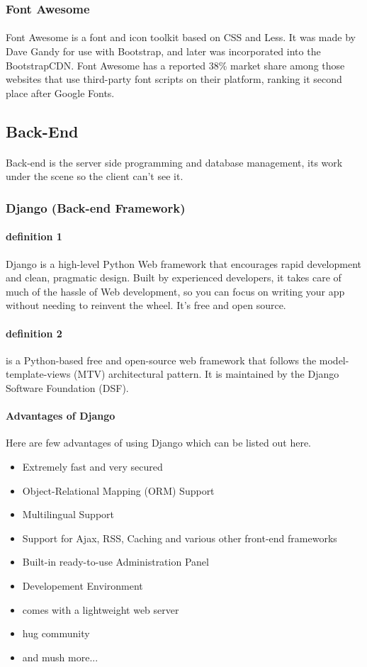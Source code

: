 \documentclass{article}
\begin{document}
	\subsubsection{Font Awesome}
	\paragraph{}
	Font Awesome is a font and icon toolkit based on CSS and Less. It was made by Dave Gandy for use with Bootstrap, and later was incorporated into the BootstrapCDN. Font Awesome has a reported 38\% market share among those websites that use third-party font scripts on their platform, ranking it second place after Google Fonts.
	\subsection{Back-End}
	\paragraph{}
	Back-end is the server side programming and database management, its work under the scene so the client can't see it.
	\subsubsection{Django (Back-end Framework)}
	\paragraph{definition 1}
	Django is a high-level Python Web framework that encourages rapid development and clean, pragmatic design. Built by experienced developers, it takes care of much of the hassle of Web development, so you can focus on writing your app without needing to reinvent the wheel. It’s free and open source.
	\paragraph{definition 2}
	is a Python-based free and open-source web framework that follows the model-template-views (MTV) architectural pattern. It is maintained by the Django Software Foundation (DSF).
	\paragraph{Advantages of Django}
	Here are few advantages of using Django which can be listed out here.
	\begin{itemize}
		\item Extremely fast and very secured
		\item Object-Relational Mapping (ORM) Support
		\item Multilingual Support
		\item Support for Ajax, RSS, Caching and various other front-end frameworks
		\item Built-in ready-to-use Administration Panel
		\item Developement Environment
		\item comes with a lightweight web server
		\item hug community
		\item and mush more...
	\end{itemize}
\end{document}
